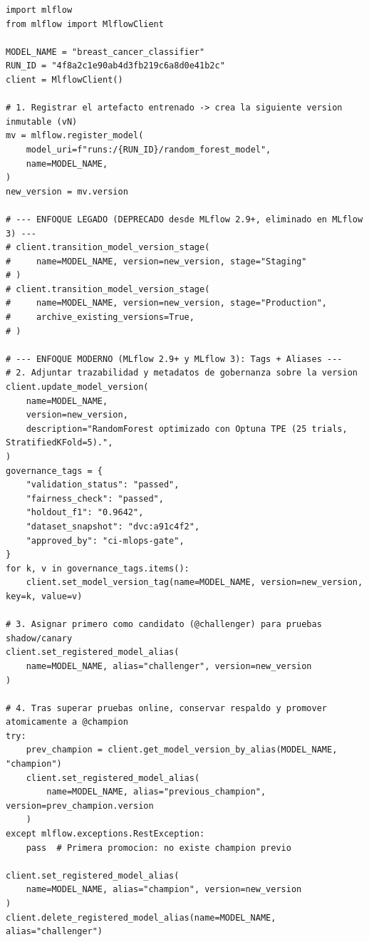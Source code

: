 \begin{lstlisting}[style=python, caption={Flujo completo de registro y promoción: contraste entre Stages (deprecado) y el enfoque moderno con Aliases y Tags de gobernanza.}, label={lst:mlflow-registry-aliases}]
import mlflow
from mlflow import MlflowClient

MODEL_NAME = "breast_cancer_classifier"
RUN_ID = "4f8a2c1e90ab4d3fb219c6a8d0e41b2c"
client = MlflowClient()

# 1. Registrar el artefacto entrenado -> crea la siguiente version inmutable (vN)
mv = mlflow.register_model(
    model_uri=f"runs:/{RUN_ID}/random_forest_model",
    name=MODEL_NAME,
)
new_version = mv.version

# --- ENFOQUE LEGADO (DEPRECADO desde MLflow 2.9+, eliminado en MLflow 3) ---
# client.transition_model_version_stage(
#     name=MODEL_NAME, version=new_version, stage="Staging"
# )
# client.transition_model_version_stage(
#     name=MODEL_NAME, version=new_version, stage="Production",
#     archive_existing_versions=True,
# )

# --- ENFOQUE MODERNO (MLflow 2.9+ y MLflow 3): Tags + Aliases ---
# 2. Adjuntar trazabilidad y metadatos de gobernanza sobre la version
client.update_model_version(
    name=MODEL_NAME,
    version=new_version,
    description="RandomForest optimizado con Optuna TPE (25 trials, StratifiedKFold=5).",
)
governance_tags = {
    "validation_status": "passed",
    "fairness_check": "passed",
    "holdout_f1": "0.9642",
    "dataset_snapshot": "dvc:a91c4f2",
    "approved_by": "ci-mlops-gate",
}
for k, v in governance_tags.items():
    client.set_model_version_tag(name=MODEL_NAME, version=new_version, key=k, value=v)

# 3. Asignar primero como candidato (@challenger) para pruebas shadow/canary
client.set_registered_model_alias(
    name=MODEL_NAME, alias="challenger", version=new_version
)

# 4. Tras superar pruebas online, conservar respaldo y promover atomicamente a @champion
try:
    prev_champion = client.get_model_version_by_alias(MODEL_NAME, "champion")
    client.set_registered_model_alias(
        name=MODEL_NAME, alias="previous_champion", version=prev_champion.version
    )
except mlflow.exceptions.RestException:
    pass  # Primera promocion: no existe champion previo

client.set_registered_model_alias(
    name=MODEL_NAME, alias="champion", version=new_version
)
client.delete_registered_model_alias(name=MODEL_NAME, alias="challenger")
\end{lstlisting}


